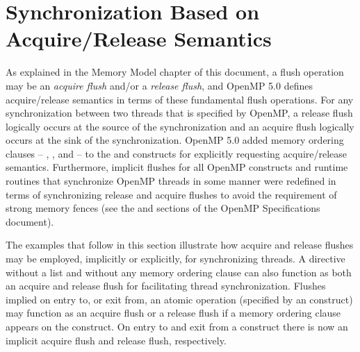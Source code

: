 \pagebreak
\section{Synchronization Based on Acquire/Release Semantics}
\label{sec:acquire_and_release_semantics}



As explained in the Memory Model chapter of this document, a flush operation
may be an \emph{acquire flush} and/or a \emph{release flush}, and OpenMP 5.0
defines acquire/release semantics in terms of these fundamental flush
operations.  For any synchronization between two threads that is specified by
OpenMP, a release flush logically occurs at the source of the synchronization
and an acquire flush logically occurs at the sink of the synchronization.
OpenMP 5.0 added memory ordering clauses -- , , and
 -- to the  and  constructs for
explicitly requesting acquire/release semantics.  Furthermore, implicit flushes
for all OpenMP constructs and runtime routines that synchronize OpenMP threads
in some manner were redefined in terms of synchronizing release and acquire
flushes to avoid the requirement of strong memory fences (see the  and  sections of the
OpenMP Specifications document).

The examples that follow in this section illustrate how acquire and release
flushes may be employed, implicitly or explicitly, for synchronizing threads. A
 directive without a list and without any memory ordering clause
can also function as both an acquire and release flush for facilitating thread
synchronization.  Flushes implied on entry to, or exit from, an atomic
operation (specified by an  construct) may function as an acquire
flush or a release flush if a memory ordering clause appears on the construct.
On entry to and exit from a  construct there is now an implicit
acquire flush and release flush, respectively.

